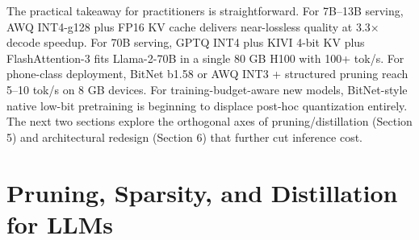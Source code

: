 \documentclass{article}
\begin{document}
The practical takeaway for practitioners is straightforward. For 7B--13B serving, AWQ INT4-g128 plus FP16 KV cache delivers near-lossless quality at 3.3× decode speedup. For 70B serving, GPTQ INT4 plus KIVI 4-bit KV plus FlashAttention-3 fits Llama-2-70B in a single 80 GB H100 with 100+ tok/s. For phone-class deployment, BitNet b1.58 or AWQ INT3 + structured pruning reach 5--10 tok/s on 8 GB devices. For training-budget-aware new models, BitNet-style native low-bit pretraining is beginning to displace post-hoc quantization entirely. The next two sections explore the orthogonal axes of pruning/distillation (Section 5) and architectural redesign (Section 6) that further cut inference cost.

\section{Pruning, Sparsity, and Distillation for LLMs}\label{pruning-sparsity-and-distillation-for-llms}
\end{document}
